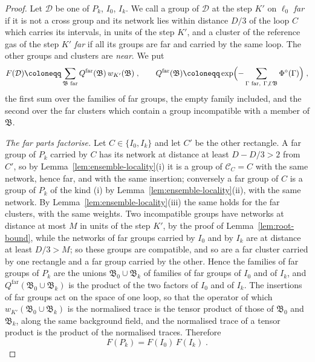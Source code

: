 \documentclass[11pt]{preprint}
\numberwithin{equation}{section}
\theoremstyle{definition}
\theoremstyle{remark}
\theoremstyle{plain}
\begin{document}
\begin{proof}
Let $\mathcal D$ be one of $P_k$, $I_0$, $I_k$. We call a group of $\mathcal D$ at the step $K'$ on $\ell_0$ \emph{far} if it is not a cross group and its network lies within distance $D/3$ of the loop $C$ which carries its intervals, in units of the step $K'$, and a cluster of the reference gas of the step $K'$ \emph{far} if all its groups are far and carried by the same loop. The other groups and clusters are \emph{near}. We put
\begin{equation}\label{eq:far-part}
    F(\mathcal D) \coloneqq \sum_{\mathfrak B \text{ far}}Q^{\mathrm{far}}(\mathfrak B)\,w_{K'}(\mathfrak B)\;,
    \qquad
    Q^{\mathrm{far}}(\mathfrak B) \coloneqq \exp\Bigl(-\sum_{\Gamma \text{ far},\ \Gamma \not\perp \mathfrak B}\Phi^\circ(\Gamma)\Bigr)\;,
\end{equation}
the first sum over the families of far groups, the empty family included, and the second over the far clusters which contain a group incompatible with a member of $\mathfrak B$.

\emph{The far parts factorise.} Let $C \in \{ I_0, I_k \}$ and let $C'$ be the other rectangle. A far group of $P_k$ carried by $C$ has its network at distance at least $D - D/3 > 2$ from $C'$, so by Lemma~\ref{lem:ensemble-locality}(i) it is a group of $\mathcal C_C = C$ with the same network, hence far, and with the same insertion; conversely a far group of $C$ is a group of $P_k$ of the kind (i) by Lemma~\ref{lem:ensemble-locality}(ii), with the same network. By Lemma~\ref{lem:ensemble-locality}(iii) the same holds for the far clusters, with the same weights. Two incompatible groups have networks at distance at most $M$ in units of the step $K'$, by the proof of Lemma~\ref{lem:root-bound}, while the networks of far groups carried by $I_0$ and by $I_k$ are at distance at least $D/3 > M$; so these groups are compatible, and so are a far cluster carried by one rectangle and a far group carried by the other. Hence the families of far groups of $P_k$ are the unions $\mathfrak B_0 \cup \mathfrak B_k$ of families of far groups of $I_0$ and of $I_k$, and $Q^{\mathrm{far}}(\mathfrak B_0 \cup \mathfrak B_k)$ is the product of the two factors of $I_0$ and of $I_k$. The insertions of far groups act on the space of one loop, so that the operator of which $w_{K'}(\mathfrak B_0 \cup \mathfrak B_k)$ is the normalised trace is the tensor product of those of $\mathfrak B_0$ and $\mathfrak B_k$, along the same background field, and the normalised trace of a tensor product is the product of the normalised traces. Therefore
\begin{equation}\label{eq:far-factorisation}
    F(P_k) = F(I_0)\,F(I_k)\;.
\end{equation}


\end{proof}
\end{document}
